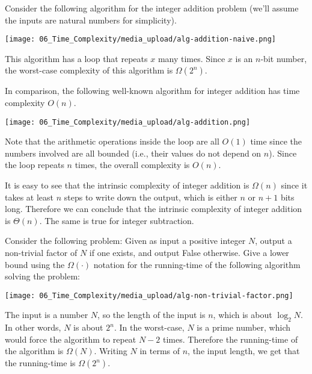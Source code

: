 \begin{note} \label{note:Algorithms-for-integer-addition}
Consider the following algorithm for the integer addition problem (we'll assume the inputs are natural numbers for simplicity).

\begin{center}
\texttt{[image: 06\_Time\_Complexity/media\_upload/alg-addition-naive.png]}
\end{center}

This algorithm has a loop that repeats $x$ many times. Since $x$ is an $n$-bit number, the worst-case complexity of this algorithm is $\Omega(2^n)$.

In comparison, the following well-known algorithm for integer addition has time complexity $O(n)$.

\begin{center}
\texttt{[image: 06\_Time\_Complexity/media\_upload/alg-addition.png]}
\end{center}

Note that the arithmetic operations inside the loop are all $O(1)$ time since the numbers involved are all bounded (i.e., their values do not depend on $n$). Since the loop repeats $n$ times, the overall complexity is $O(n)$.

It is easy to see that the intrinsic complexity of integer addition is $\Omega(n)$ since it takes at least $n$ steps to write down the output, which is either $n$ or $n+1$ bits long. Therefore we can conclude that the intrinsic complexity of integer addition is $\Theta(n)$. The same is true for integer subtraction.
\end{note}


\begin{flex}
\begin{exercise} \label{exercise:Running-time-of-the-factoring-problem}
Consider the following problem: Given as input a positive integer $N$, output a non-trivial factor of $N$ if one exists, and output False otherwise. Give a lower bound using the $\Omega(\cdot)$ notation for the running-time of the following algorithm solving the problem:

\begin{center}
\texttt{[image: 06\_Time\_Complexity/media\_upload/alg-non-trivial-factor.png]}
\end{center}
\end{exercise}

\begin{solution}
The input is a number $N$, so the length of the input is $n$, which is about $\log_2 N$. In other words, $N$ is about $2^n$. In the worst-case, $N$ is a prime number, which would force the algorithm to repeat $N-2$ times. Therefore the running-time of the algorithm is $\Omega(N)$. Writing $N$ in terms of $n$, the input length, we get that the running-time is $\Omega(2^n)$.
\end{solution}
\end{flex}


